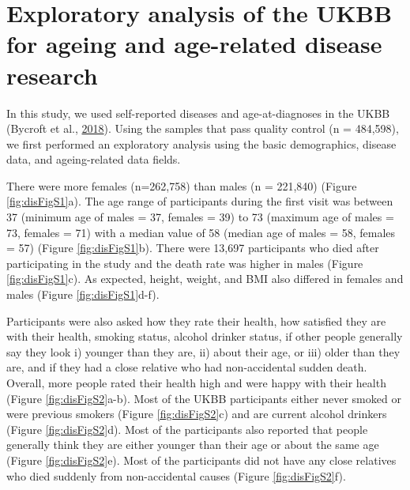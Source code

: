 \documentclass[12pt,twoside]{unicam}
\begin{document}
\hypertarget{exploratory-analysis-of-the-ukbb-for-ageing-and-age-related-disease-research}{%
\section{Exploratory analysis of the UKBB for ageing and age-related disease research}\label{exploratory-analysis-of-the-ukbb-for-ageing-and-age-related-disease-research}}

In this study, we used self-reported diseases and age-at-diagnoses in the UKBB (Bycroft et al., \protect\hyperlink{ref-Bycroft2018}{2018}). Using the samples that pass quality control (n = 484,598), we first performed an exploratory analysis using the basic demographics, disease data, and ageing-related data fields.

There were more females (n=262,758) than males (n = 221,840) (Figure \ref{fig:disFigS1}a). The age range of participants during the first visit was between 37 (minimum age of males = 37, females = 39) to 73 (maximum age of males = 73, females = 71) with a median value of 58 (median age of males = 58, females = 57) (Figure \ref{fig:disFigS1}b). There were 13,697 participants who died after participating in the study and the death rate was higher in males (Figure \ref{fig:disFigS1}c). As expected, height, weight, and BMI also differed in females and males (Figure \ref{fig:disFigS1}d-f).

Participants were also asked how they rate their health, how satisfied they are with their health, smoking status, alcohol drinker status, if other people generally say they look i) younger than they are, ii) about their age, or iii) older than they are, and if they had a close relative who had non-accidental sudden death. Overall, more people rated their health high and were happy with their health (Figure \ref{fig:disFigS2}a-b). Most of the UKBB participants either never smoked or were previous smokers (Figure \ref{fig:disFigS2}c) and are current alcohol drinkers (Figure \ref{fig:disFigS2}d). Most of the participants also reported that people generally think they are either younger than their age or about the same age (Figure \ref{fig:disFigS2}e). Most of the participants did not have any close relatives who died suddenly from non-accidental causes (Figure \ref{fig:disFigS2}f).
\end{document}

